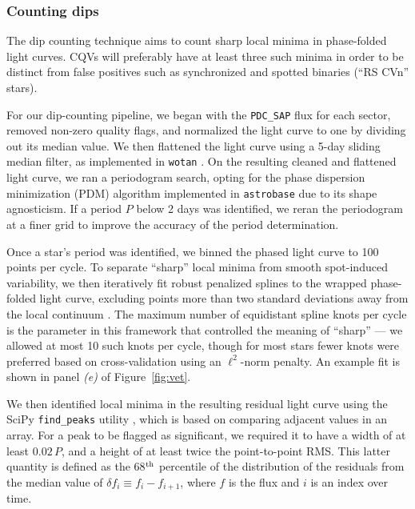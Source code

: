 \documentclass[11pt,twocolumn,tighten]{aastex63}
\begin{document}
\subsubsection{Counting dips}
\label{subsec:counting}

The dip counting technique aims to count sharp local minima in
phase-folded light curves.  CQVs will preferably have at least three
such minima in order to be distinct from false positives such as
synchronized and spotted binaries (``RS CVn'' stars). 

For our dip-counting pipeline, we began with the {\tt PDC\_SAP} flux
for each sector, removed non-zero quality flags, and normalized the
light curve to one by dividing out its median value.  We then
flattened the light curve using a 5-day sliding median filter, as
implemented in \texttt{wotan} \citep{2019AJ....158..143H}.  On the
resulting cleaned and flattened light curve, we ran a periodogram
search, opting for the \citet{1978ApJ...224..953S} phase dispersion
minimization (PDM) algorithm implemented in \texttt{astrobase}
\citep{2021zndo...1011188B} due to its shape agnosticism.  If a period
$P$ below 2 days was identified, we reran the periodogram at a finer
grid to improve the accuracy of the period determination.

Once a star's period was identified, we binned the phased light curve
to 100 points per cycle.  To separate ``sharp'' local minima from
smooth spot-induced variability, we then iteratively fit
robust penalized splines to the wrapped phase-folded light curve,
excluding points more than two standard deviations away from the local
continuum \citep{2019AJ....158..143H}.  The maximum number of
equidistant spline knots per cycle is the parameter in this framework
that controlled the meaning of ``sharp'' --- we allowed at most 10
such knots per cycle, though for most stars fewer knots were preferred
based on cross-validation using an $\ell^2$-norm penalty.  An example
fit is shown in panel {\it (e)} of Figure~\ref{fig:vet}.

We then identified local minima in the resulting residual light curve
using the SciPy \texttt{find\_peaks} utility
\citep{2020NatMe..17..261V}, which is based on comparing adjacent
values in an array.  For a peak to be flagged as significant, we
required it to have a width of at least $0.02\,P$, and a height of at
least twice the point-to-point RMS.  This latter quantity is defined
as the 68$^{\rm th}$ percentile of the distribution of the residuals
from the median value of $\delta f_i \equiv f_i - f_{i+1}$, where $f$
is the flux and $i$ is an index over time.
\end{document}
